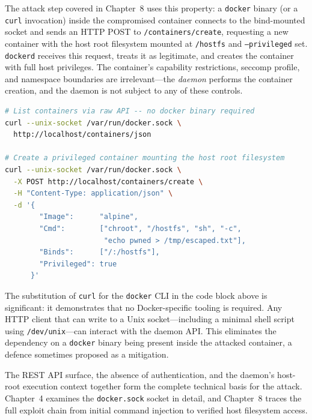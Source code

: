 The attack step covered in Chapter~8 uses this property: a \texttt{docker} binary
(or a \texttt{curl} invocation) inside the compromised container connects to the
bind-mounted socket and sends an HTTP POST to \texttt{/containers/create},
requesting a new container with the host root filesystem mounted at
\texttt{/hostfs} and \texttt{--privileged} set. \texttt{dockerd} receives this
request, treats it as legitimate, and creates the container with full host privileges.
The container's capability restrictions, seccomp profile, and namespace boundaries
are irrelevant---the \textit{daemon} performs the container creation, and the daemon
is not subject to any of these controls.

\begin{lstlisting}[language=bash]
# List containers via raw API -- no docker binary required
curl --unix-socket /var/run/docker.sock \
  http://localhost/containers/json

# Create a privileged container mounting the host root filesystem
curl --unix-socket /var/run/docker.sock \
  -X POST http://localhost/containers/create \
  -H "Content-Type: application/json" \
  -d '{
        "Image":      "alpine",
        "Cmd":        ["chroot", "/hostfs", "sh", "-c",
                       "echo pwned > /tmp/escaped.txt"],
        "Binds":      ["/:/hostfs"],
        "Privileged": true
      }'
\end{lstlisting}

The substitution of \texttt{curl} for the \texttt{docker} CLI in the code block
above is significant: it demonstrates that no Docker-specific tooling is required.
Any HTTP client that can write to a Unix socket---including a minimal shell script
using \texttt{/dev/unix}---can interact with the daemon API. This eliminates the
dependency on a \texttt{docker} binary being present inside the attacked container,
a defence sometimes proposed as a mitigation.

The REST API surface, the absence of authentication, and the daemon's host-root
execution context together form the complete technical basis for the attack. Chapter~4
examines the \texttt{docker.sock} socket in detail, and Chapter~8 traces the full
exploit chain from initial command injection to verified host filesystem access.